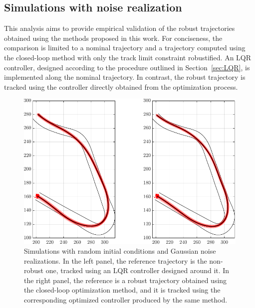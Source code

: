 \subsection{Simulations with noise realization}
This analysis aims to provide empirical validation of the robust trajectories obtained using the methods proposed in this work. For conciseness, the comparison is limited to a nominal trajectory and a trajectory computed using the closed-loop method with only the track limit constraint robustified.
An LQR controller, designed according to the procedure outlined in Section~\ref{sec:LQR}, is implemented along the nominal trajectory. In contrast, the robust trajectory is tracked using the controller directly obtained from the optimization process.

\begin{figure}
	\centering
	\includegraphics{Fig/olcl_traj_strings.pdf}
	\caption{Simulations with random initial conditions and Gaussian noise realizations. In the left panel, the reference trajectory is the non-robust one, tracked using an LQR controller designed around it. In the right panel, the reference is a robust trajectory obtained using the closed-loop optimization method, and it is tracked using the corresponding optimized controller produced by the same method.}
	\label{fig:traj_strings}
\end{figure}